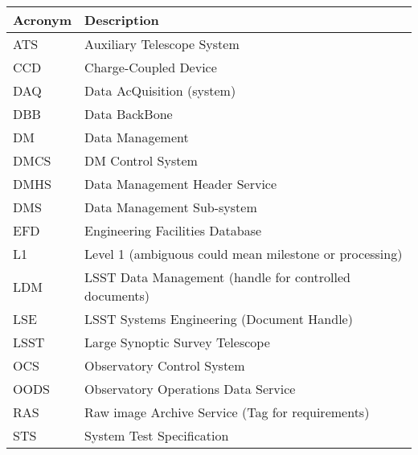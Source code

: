 \addtocounter{table}{-1}
\begin{longtable}{|l|p{}|}\hline
\textbf{Acronym} & \textbf{Description}  \\\hline

ATS & Auxiliary Telescope System \\\hline
CCD & Charge-Coupled Device \\\hline
DAQ & Data AcQuisition (system) \\\hline
DBB & Data BackBone \\\hline
DM & Data Management \\\hline
DMCS & DM Control System \\\hline
DMHS & Data Management Header Service \\\hline
DMS & Data Management Sub-system \\\hline
EFD & Engineering Facilities Database \\\hline
L1 & Level 1 (ambiguous could mean milestone or processing) \\\hline
LDM & LSST Data Management (handle for controlled documents) \\\hline
LSE & LSST Systems Engineering (Document Handle) \\\hline
LSST & Large Synoptic Survey Telescope \\\hline
OCS & Observatory Control System \\\hline
OODS & Observatory Operations Data Service \\\hline
RAS & Raw image Archive Service (Tag for requirements) \\\hline
STS & System Test Specification \\\hline
\end{longtable}
